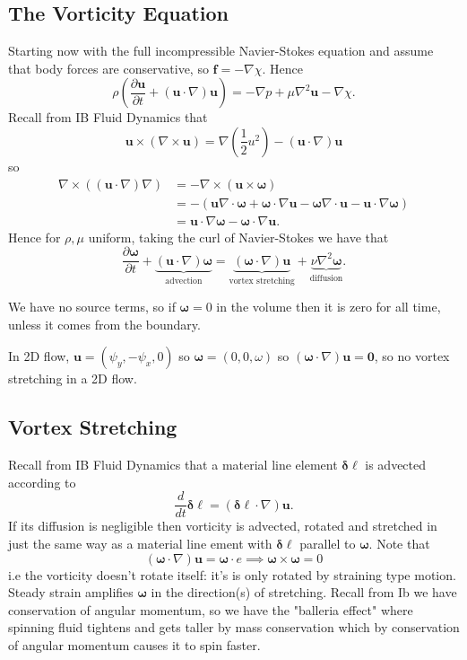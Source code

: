 \documentclass{article}
\begin{document}
\subsection{The Vorticity Equation}
Starting now with the full incompressible Navier-Stokes equation and assume that body forces are conservative, so $ \mathbf f = - \nabla\chi $. Hence
\[
	\rho\left(\frac{\partial \mathbf u}{\partial t} + (\mathbf u \cdot\nabla) \mathbf u \right) =-\nabla p + \mu \nabla^2 \mathbf u - \nabla \chi.
\]
Recall from IB Fluid Dynamics that
\[
	\mathbf u \times(\nabla \times \mathbf u) = \nabla\left(\frac 12 u^2\right) - (\mathbf u \cdot \nabla)\mathbf u
\]
so 
\begin{align*}
	\nabla\times((\mathbf u\cdot\nabla)\nabla) &= - \nabla\times (\mathbf u \times \boldsymbol \omega) \\
						   &= -( \mathbf u \nabla \cdot \boldsymbol \omega + \boldsymbol\omega \cdot\nabla\mathbf u - \boldsymbol \omega \nabla \cdot \mathbf u  - \mathbf u \cdot \nabla \boldsymbol \omega) \\
						   &= \mathbf u \cdot \nabla\boldsymbol\omega - \boldsymbol\omega \cdot \nabla \mathbf u.
\end{align*}
Hence for $ \rho,\mu $ uniform, taking the curl of Navier-Stokes we have that
\[
	\frac{\partial \boldsymbol\omega} {\partial t} + \underbrace{(\mathbf u \cdot\nabla) \boldsymbol\omega}_{\text{advection}} = \underbrace{(\boldsymbol\omega \cdot\nabla)\mathbf u}_{\text{vortex stretching}} + \underbrace{\nu \nabla^2 \boldsymbol\omega}_{\text{diffusion}}.
\]
\begin{remark}
  We have no source terms, so if $ \boldsymbol\omega = 0 $ in the volume then it is zero for all time, unless it comes from the boundary.
\end{remark}
\begin{remark}
  In 2D flow, $ \mathbf u = (\psi_y,-\psi_x,0) $ so $ \boldsymbol\omega = (0,0,\omega) $ so $ (\boldsymbol \omega \cdot \nabla) \mathbf u =\mathbf 0 $, so no vortex stretching in a 2D flow.
\end{remark}
\subsection{Vortex Stretching}
Recall from IB Fluid Dynamics that a material line element $ \boldsymbol{\delta \ell} $ is advected according to 
\[
	\frac d{dt} \boldsymbol{\delta \ell} = (\boldsymbol{\delta \ell} \cdot\nabla) \mathbf u.
\]
If its diffusion is negligible then vorticity is advected, rotated and stretched in just the same way as a material line ement with $ \boldsymbol{\delta \ell} $ parallel to $ \boldsymbol \omega $. Note that
\[
	(\boldsymbol\omega \cdot\nabla)\mathbf u = \boldsymbol\omega \cdot e \implies \boldsymbol \omega \times \boldsymbol \omega = 0
\]
i.e the vorticity doesn't rotate itself: it's is only rotated by straining type motion. Steady strain amplifies $ \boldsymbol\omega $ in the direction(s) of stretching. Recall from Ib we have conservation of angular momentum, so we have the "balleria effect" where spinning fluid tightens and gets taller by mass conservation which by conservation of angular momentum causes it to spin faster. 
\end{document}
